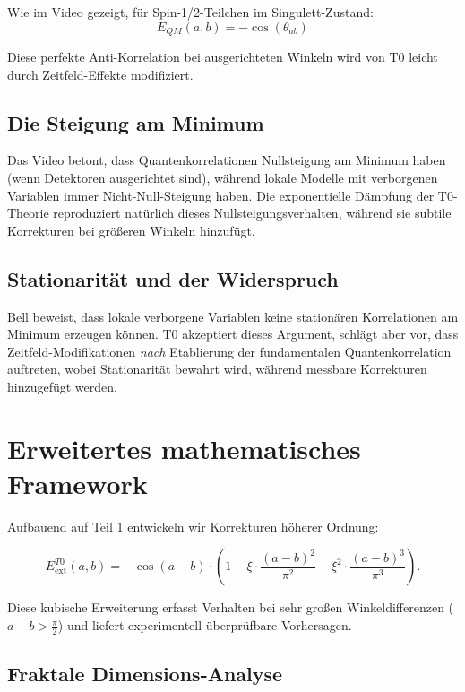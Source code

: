 Wie im Video gezeigt, für Spin-1/2-Teilchen im Singulett-Zustand:
\begin{equation}
E_{QM}(a,b) = -\cos(\theta_{ab})
\end{equation}

Diese perfekte Anti-Korrelation bei ausgerichteten Winkeln wird von T0 leicht durch Zeitfeld-Effekte modifiziert.

\subsection{Die Steigung am Minimum}

Das Video betont, dass Quantenkorrelationen Nullsteigung am Minimum haben (wenn Detektoren ausgerichtet sind), während lokale Modelle mit verborgenen Variablen immer Nicht-Null-Steigung haben. Die exponentielle Dämpfung der T0-Theorie reproduziert natürlich dieses Nullsteigungsverhalten, während sie subtile Korrekturen bei größeren Winkeln hinzufügt.

\subsection{Stationarität und der Widerspruch}

Bell beweist, dass lokale verborgene Variablen keine stationären Korrelationen am Minimum erzeugen können. T0 akzeptiert dieses Argument, schlägt aber vor, dass Zeitfeld-Modifikationen \textit{nach} Etablierung der fundamentalen Quantenkorrelation auftreten, wobei Stationarität bewahrt wird, während messbare Korrekturen hinzugefügt werden.

\section{Erweitertes mathematisches Framework}
\label{sec:extended_math}

Aufbauend auf Teil 1 entwickeln wir Korrekturen höherer Ordnung:

\begin{equation}
E^{T0}_{\text{ext}}(a,b) = -\cos(a-b) \cdot \left(1 - \xi \cdot \frac{(a-b)^2}{\pi^2} - \xi^2 \cdot \frac{(a-b)^3}{\pi^3}\right).
\label{eq:cubic_expansion}
\end{equation}

Diese kubische Erweiterung erfasst Verhalten bei sehr großen Winkeldifferenzen ($a-b > \frac{\pi}{2}$) und liefert experimentell überprüfbare Vorhersagen.

\subsection{Fraktale Dimensions-Analyse}

